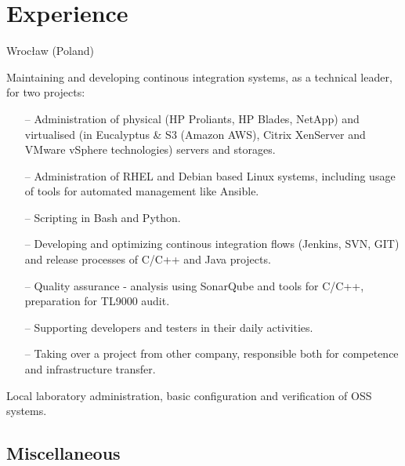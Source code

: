 \documentclass[11pt,a4paper,sans]{moderncv}
\begin{document}
\makecvtitle
\section{Experience}
%
    {Wrocław (Poland)}{}{Maintaining and developing continous integration systems, as a technical leader, for two projects:
\begin{itemize}
    \item[--]Administration of physical (HP Proliants, HP Blades, NetApp) and virtualised (in Eucalyptus \& S3 (Amazon AWS),%
        Citrix XenServer and VMware vSphere technologies) servers and storages.
    \item[--]Administration of RHEL and Debian based Linux systems, including usage of tools for automated management like Ansible.
    \item[--]Scripting in Bash and Python.
    \item[--]Developing and optimizing continous integration flows (Jenkins, SVN, GIT) and release processes of C/C++ and Java projects.
    \item[--]Quality assurance - analysis using SonarQube and tools for C/C++, preparation for TL9000 audit.
    \item[--]Supporting developers and testers in their daily activities.
    \item[--]Taking over a project from other company, responsible both for competence and infrastructure transfer.
\end{itemize}
}
%
    {Local laboratory administration, basic configuration and verification of OSS systems.}
\subsection{Miscellaneous}
\end{document}
